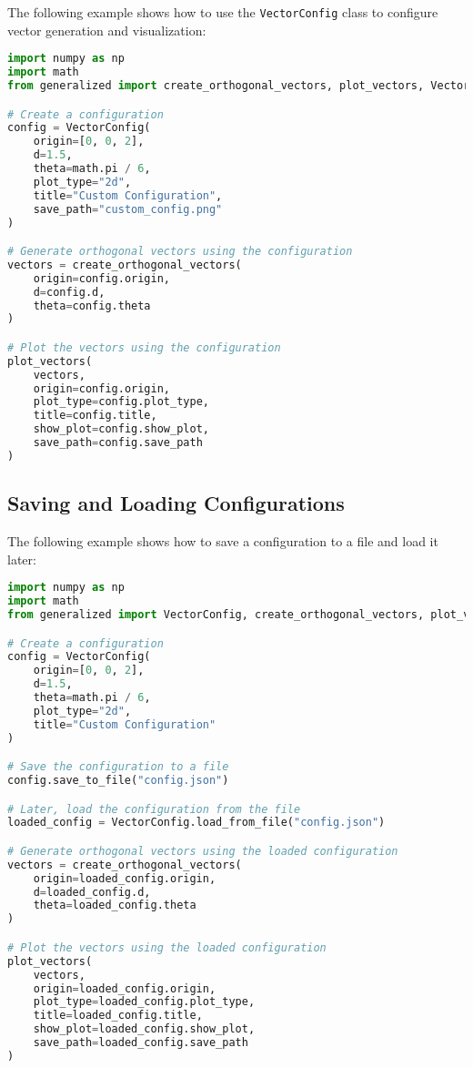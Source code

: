 The following example shows how to use the \texttt{VectorConfig} class to configure vector generation and visualization:

\begin{lstlisting}[language=Python]
import numpy as np
import math
from generalized import create_orthogonal_vectors, plot_vectors, VectorConfig

# Create a configuration
config = VectorConfig(
    origin=[0, 0, 2],
    d=1.5,
    theta=math.pi / 6,
    plot_type="2d",
    title="Custom Configuration",
    save_path="custom_config.png"
)

# Generate orthogonal vectors using the configuration
vectors = create_orthogonal_vectors(
    origin=config.origin,
    d=config.d,
    theta=config.theta
)

# Plot the vectors using the configuration
plot_vectors(
    vectors,
    origin=config.origin,
    plot_type=config.plot_type,
    title=config.title,
    show_plot=config.show_plot,
    save_path=config.save_path
)
\end{lstlisting}

\subsection{Saving and Loading Configurations}

The following example shows how to save a configuration to a file and load it later:

\begin{lstlisting}[language=Python]
import numpy as np
import math
from generalized import VectorConfig, create_orthogonal_vectors, plot_vectors

# Create a configuration
config = VectorConfig(
    origin=[0, 0, 2],
    d=1.5,
    theta=math.pi / 6,
    plot_type="2d",
    title="Custom Configuration"
)

# Save the configuration to a file
config.save_to_file("config.json")

# Later, load the configuration from the file
loaded_config = VectorConfig.load_from_file("config.json")

# Generate orthogonal vectors using the loaded configuration
vectors = create_orthogonal_vectors(
    origin=loaded_config.origin,
    d=loaded_config.d,
    theta=loaded_config.theta
)

# Plot the vectors using the loaded configuration
plot_vectors(
    vectors,
    origin=loaded_config.origin,
    plot_type=loaded_config.plot_type,
    title=loaded_config.title,
    show_plot=loaded_config.show_plot,
    save_path=loaded_config.save_path
)
\end{lstlisting}

